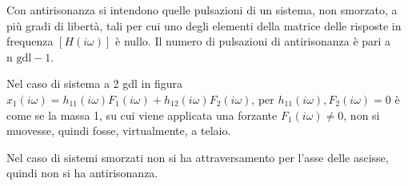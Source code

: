 Con antirisonanza si intendono quelle pulsazioni di un sistema, non smorzato, a più gradi di libertà, tali per cui uno degli elementi della matrice delle risposte in frequenza \(\left[ H(i\omega) \right]\) è nullo.
Il numero di pulsazioni di antirisonanza è pari a \(\text{n gdl} - 1\).

Nel caso di sistema a 2 gdl in figura  \( x_1(i\omega) = h_{11}(i\omega) F_1(i\omega) + h_{12}(i\omega)F_2(i\omega) \), per \( h_{11}(i\omega), F_2(i\omega) = 0\) è come se la massa 1, su cui viene applicata una forzante \(F_1(i\omega)\neq 0\), non si muovesse, quindi fosse, virtualmente, a telaio.

Nel caso di sistemi smorzati non si ha attraversamento per l'asse delle ascisse, quindi non si ha antirisonanza.

